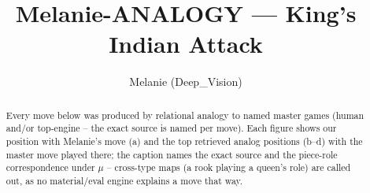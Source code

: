 \documentclass[11pt]{article}
\title{Melanie-ANALOGY — King's Indian Attack}
\author{Melanie (Deep\_Vision)}
\date{}
\begin{document}
\maketitle

\begin{abstract}Every move below was produced by relational analogy to named master games (human and/or top-engine -- the exact source is named per move). Each figure shows our position with Melanie's move (a) and the top retrieved analog positions (b--d) with the master move played there; the caption names the exact source and the piece-role correspondence under $\mu$ -- cross-type maps (a rook playing a queen's role) are called out, as no material/eval engine explains a move that way.\end{abstract}

\begin{figure}[p]\centering
\begin{subfigure}{0.46\textwidth}\centering
\resizebox{\linewidth}{!}{%
\newchessgame
\chessboard[
  setfen={rnbq1rk1/pp2bppp/4pn2/2pp4/7P/3P1NP1/PPPNPPB1/R1BQ1RK1 b - - 0 7},
  showmover=false,
  pgfstyle=straightmove, color=movearrow, markmove={d8-d6}
]}
\caption{}
\end{subfigure}\hfill
\begin{subfigure}{0.46\textwidth}\centering
\resizebox{\linewidth}{!}{%
\newchessgame
\chessboard[
  setfen={r2q1rk1/pp1nppbp/5np1/3p1b2/3P4/1P3NP1/PB2PPBP/RN1Q1RK1 w - - 0 10},
  showmover=false,
  pgfstyle=straightmove, color=movearrow, markmove={b1-c3}
]}
\caption{}
\end{subfigure}
\\[4pt]
\begin{subfigure}{0.46\textwidth}\centering
\resizebox{\linewidth}{!}{%
\newchessgame
\chessboard[
  setfen={r2q1rk1/pp1nppbp/5np1/3p1b2/3P4/1P3NP1/PB2PPBP/RN1Q1RK1 w - - 0 10},
  showmover=false,
  pgfstyle=straightmove, color=movearrow, markmove={b1-c3}
]}
\caption{}
\end{subfigure}\hfill
\begin{subfigure}{0.46\textwidth}\centering
\resizebox{\linewidth}{!}{%
\newchessgame
\chessboard[
  setfen={rnbq1rk1/ppp1ppbp/5np1/3p4/8/3P1NP1/PPPNPPBP/R1BQ1RK1 b - - 2 6},
  showmover=false,
  pgfstyle=straightmove, color=movearrow, markmove={b8-c6}
]}
\caption{}
\end{subfigure}

\end{figure}
\end{document}
